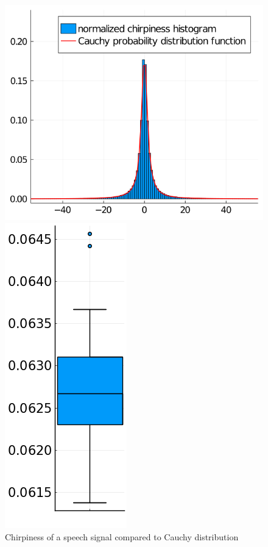 \documentclass[american,]{article}
\theoremstyle{definition}
\theoremstyle{definition}
\theoremstyle{definition}
\theoremstyle{remark}
\begin{document}
\begin{figure}[H]
    \begin{minipage}{.47\linewidth}
    \centering
    \includegraphics[width=\textwidth]{img/cauchy_dist_pdf.png}
    \caption{Chirpiness of a speech signal compared to Cauchy distribution}
    \label{fig:cauchy_dist}
    \end{minipage}%
    \hfill
    \begin{minipage}{.47\linewidth}
    \centering
        \includegraphics[width=.27\textwidth]{img/cauchy_pt_estimate_iqr_2.png}\hspace{0.1\linewidth}%

\end{minipage}
\end{figure}
\end{document}
